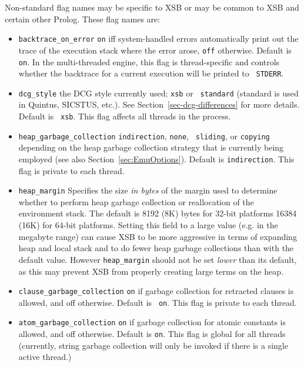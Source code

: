 \begin{description}
Non-standard flag names may be specific to XSB or may be common to XSB
and certain other Prolog.  These flag names are:
\begin{itemize}
%
\item {\tt backtrace\_on\_error} {\tt on} iff system-handled errors
automatically print out the trace of the execution stack where the
error arose, {\tt off} otherwise. Default is {\tt on}.  In the
multi-threaded engine, this flag is thread-specific and controls
whether the backtrace for a current execution will be printed to {\tt
  STDERR}.
\item {\tt dcg\_style}  the DCG style currently used; {\tt xsb} or {\tt
  standard} (standard is used in Quintus, SICSTUS, etc.).  See
Section~\ref{sec-dcg-differences} for more details. Default is {\tt
  xsb}. This flag affects all threads in the process.
%
\item {\tt heap\_garbage\_collection}  {\tt indirection}, {\tt none}, {\tt
  sliding}, or {\tt copying} depending on the heap garbage collection
strategy that is currently being employed (see also
Section~\ref{sec:EmuOptions}).  Default is {\tt indirection}.  This
flag is private to each thread.  
%
\item {\tt heap\_margin} Specifies the size {\em in bytes} of the
  margin used to determine whether to perform heap garbage collection
  or reallocation of the environment stack.  The default is 8192 (8K)
  bytes for 32-bit platforms 16384 (16K) for 64-bit platforms.
  Setting this field to a large value (e.g. in the megabyte range) can
  cause XSB to be more aggressive in terms of expanding heap and local
  stack and to do fewer heap garbage collections than with the default
  value.  However {\tt heap\_margin} should not be set {\em lower}
  than its default, as this may prevent XSB from properly creating
  large terms on the heap.

%
\item {\tt clause\_garbage\_collection}  {\tt on} if garbage collection for
retracted clauses is allowed, and off otherwise. Default is {\tt
  on}.  This flag is private to each thread.  
%
\item {\tt atom\_garbage\_collection}  {\tt on} if garbage collection for
atomic constants is allowed, and off otherwise. Default is {\tt on}.
This flag is global for all threads (currently, string garbage
collection will only be invoked if there is a single active thread.)


\end{itemize}
\end{description}
